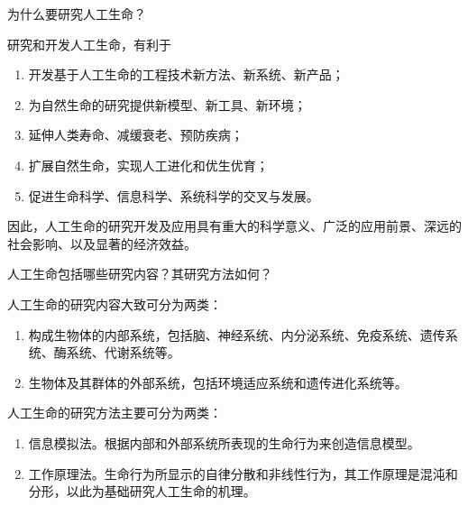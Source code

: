 \begin{question}
为什么要研究人工生命？
\end{question}
\begin{solution}
研究和开发人工生命，有利于
	\begin{enumerate}
		\item 开发基于人工生命的工程技术新方法、新系统、新产品；
		\item 为自然生命的研究提供新模型、新工具、新环境；
		\item 延伸人类寿命、减缓衰老、预防疾病；
		\item 扩展自然生命，实现人工进化和优生优育；
		\item 促进生命科学、信息科学、系统科学的交叉与发展。
	\end{enumerate}
	因此，人工生命的研究开发及应用具有重大的科学意义、广泛的应用前景、深远的社会影响、以及显著的经济效益。
\end{solution}

\begin{question}
人工生命包括哪些研究内容？其研究方法如何？
\end{question}
\begin{solution}
人工生命的研究内容大致可分为两类：
	\begin{enumerate}
		\item 构成生物体的内部系统，包括脑、神经系统、内分泌系统、免疫系统、遗传系统、酶系统、代谢系统等。
		\item 生物体及其群体的外部系统，包括环境适应系统和遗传进化系统等。
	\end{enumerate} \par
	人工生命的研究方法主要可分为两类：
	\begin{enumerate}
		\item 信息模拟法。根据内部和外部系统所表现的生命行为来创造信息模型。
		\item 工作原理法。生命行为所显示的自律分散和非线性行为，其工作原理是混沌和分形，以此为基础研究人工生命的机理。
	\end{enumerate}
\end{solution}